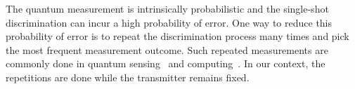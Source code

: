 

The quantum measurement is intrinsically probabilistic and the single-shot discrimination can incur a high probability of error. One way to reduce this probability of error is to repeat the 
discrimination process many times and pick the most frequent measurement outcome. 
Such repeated measurements are commonly done in quantum sensing~\cite{RevModPhys.quantumsensing} and computing~\cite{Shor_1997}.
In our context, the repetitions are done while the transmitter remains fixed.




